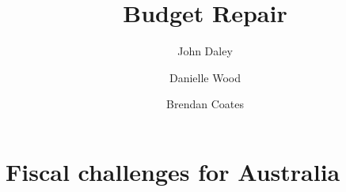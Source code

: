 \usepackage{import}


\title{Budget Repair}
\author{John Daley \and Danielle Wood \and Brendan Coates}








\maketitle
\contentspage

\part{Fiscal challenges for Australia}\label{part:FISCAL}
\setlength{\overviewextra}{-3pt}
\addtolength{\columnsep}{\overviewextra}
